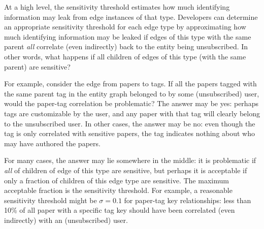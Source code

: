 At a high level, the sensitivity threshold estimates how much identifying information may leak from
edge instances of that type. Developers can determine an appropriate sensitivity threshold for each
edge type by approximating how much identifying information may be leaked if edges of this type with
the same parent \emph{all} correlate (even indirectly) back to the entity being unsubscribed. In
other words, what happens if all children of edges of this type (with the same parent) are
sensitive?

For example, consider the edge from papers to tags. If all the papers tagged with the same parent
tag in the entity graph belonged to by some (unsubscribed) user, would the paper-tag correlation be
problematic? The answer may be yes: perhaps tags are customizable by the user, and any paper with
that tag will clearly belong to the unsubscribed user. In other cases, the answer may be no: even
though the tag is only correlated with sensitive papers, the tag indicates nothing about who may
have authored the papers.

For many cases, the answer may lie somewhere in the middle: it is problematic if \emph{all} of
children of edge of this type are sensitive, but perhaps it is acceptable if only a fraction of
children of this edge type are sensitive. The maximum acceptable fraction is the sensitivity
threshold. For example, a reasonable sensitivity threshold might be $\sigma = 0.1$ for paper-tag
key relationships: less than 10\% of all paper with a specific tag key should have been correlated
(even indirectly) with an (unsubscribed) user. 


